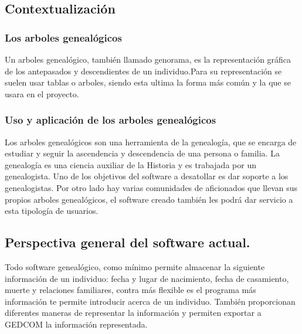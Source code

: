 \documentclass[12pt]{article} %
\begin{document}
\subsection{Contextualización}

\subsubsection{Los arboles genealógicos}
Un arboles genealógico, también llamado genorama, es la representación gráfica de los antepasados  y descendientes de un individuo.Para su representación  se suelen usar tablas o arboles, siendo esta ultima la forma más común y la que se usara en el proyecto.

\subsubsection{Uso y aplicación de los arboles genealógicos}
Los arboles genealógicos son una herramienta de la genealogía, que se encarga de estudiar y seguir la ascendencia y descendencia de una persona o familia. La genealogía es una ciencia auxiliar de la Historia y es trabajada por un genealogista. Uno de los objetivos del software a desatollar es dar soporte a los genealogistas. \linebreak Por otro lado hay varias comunidades de aficionados que llevan sus propios arboles genealógicos, el software creado también les podrá dar servicio a esta tipología de usuarios.

\newpage
\subsection{Perspectiva general del software actual.}
Todo software genealógico, como mínimo permite almacenar la siguiente información de un individuo: fecha y lugar de nacimiento, fecha de casamiento, muerte y relaciones familiares, contra más flexible es el programa más información te permite introducir acerca de un individuo. También proporcionan diferentes maneras de representar la información y permiten exportar a GEDCOM la información representada.

\noindent{}
\end{document}
